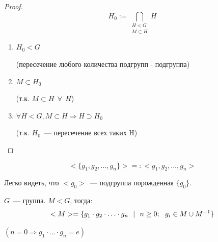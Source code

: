 \begin{proof}
    \[ H_0 := \bigcap_{\substack{ H < G \\ M \subset H}} H \]
    \begin{enumerate}
        \item $H_0 < G$
        
        (пересечение любого количества подгрупп - подгруппа)
        \item $M \subset H_0$
        
        (т.к. $M \subset H \ \ \forall \ \ H$)

        \item $\forall H < G, M \subset H \Rightarrow H \supset H_0$
        
        (т.к. $H_0$~--- пересечение всех таких H)
    \end{enumerate}   
\end{proof}

\begin{Proposition}{}{}
    \[
    <\{g_1, g_2, \ldots, g_n \} > =: <g_1, g_2, \ldots, g_n>
    \]
\end{Proposition}

\begin{remark}
    Легко видеть, что $<g_0>$~--- подгруппа порожденная $\{g_0\}$.
\end{remark}

\begin{Proposition}{}{}

    $G$~--- группа. $M < G$, тогда:
    \[
    <M> = \{ g_1\cdot g_2\textsc{} \cdot \ldots \cdot g_n \ \ | \ \ n \ge 0; \ \ g_i \in M \cup M^{-1} \} 
    \]

    \begin{remark}
        $(n = 0 \Rightarrow g_1 \cdot \ldots \cdot g_n = e)$
    \end{remark}
\end{Proposition}

